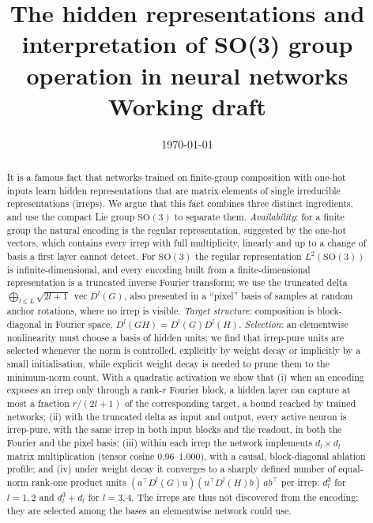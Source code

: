 \documentclass[a4paper,11pt]{article}
\title{The hidden representations and interpretation of SO(3) group operation in neural networks\\[0.5em]
\large Working draft}
\author{\todo{authors}}
\date{\today}
\theoremstyle{remark}
\theoremstyle{definition}
\newcommand{\vect}{\operatorname{vec}}
\newcommand{\SO}{\mathrm{SO}(3)}
\begin{document}
\maketitle

\begin{abstract}
It is a famous fact that networks trained on finite-group composition with one-hot
inputs learn hidden representations that are matrix elements of single irreducible
representations (irreps). We argue that this fact combines three distinct
ingredients, and use the compact Lie group $\SO$ to separate them.
\emph{Availability}: for a finite group the natural encoding is the regular
representation, suggested by the one-hot vectors, which contains every irrep with
full multiplicity, linearly and up to a change of basis a first layer cannot
detect. For $\SO$ the regular representation $L^2(\SO)$ is infinite-dimensional,
and every encoding built from a finite-dimensional representation is a truncated
inverse Fourier transform; we use the truncated delta
$\bigoplus_{l\le L}\sqrt{2l+1}\,\vect D^l(G)$, also presented in a ``pixel'' basis of
samples at random anchor rotations, where no irrep is visible. \emph{Target structure}: composition is block-diagonal in
Fourier space, $D^l(GH)=D^l(G)D^l(H)$. \emph{Selection}: an elementwise
nonlinearity must choose a basis of hidden units; we find that irrep-pure units are selected whenever the norm is controlled,
explicitly by weight decay or implicitly by a small initialisation, while explicit
weight decay is needed to prune them to the minimum-norm count. With a
quadratic activation we show that (i) when an encoding exposes an irrep only
through a rank-$r$ Fourier block, a hidden layer can capture at most a fraction
$r/(2l+1)$ of the corresponding target, a bound reached by trained networks;
(ii) with the truncated delta as input and output, every active neuron is
irrep-pure, with the same irrep in both input blocks and the readout, in both the
Fourier and the pixel basis; (iii) within each irrep the network implements
$d_l\times d_l$ matrix multiplication (tensor cosine $0.96$--$1.000$), with a
causal, block-diagonal ablation profile; and (iv) under weight decay it converges
to a sharply defined number of equal-norm rank-one product units
$(a^\top D^l(G)u)(u^\top D^l(H)b)\,ab^\top$ per irrep: $d_l^3$ for $l=1,2$ and
$d_l^3+d_l$ for $l=3,4$. The irreps are thus not discovered from the encoding;
they are selected among the bases an elementwise network could use.
\end{abstract}

\tableofcontents
\end{document}
